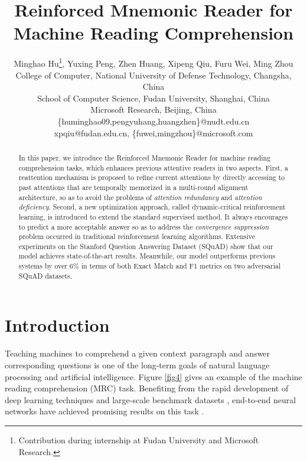 \documentclass{article}
\title{Reinforced Mnemonic Reader for Machine Reading Comprehension}
\author{
Minghao Hu\thanks{Contribution during internship at Fudan University and Microsoft Research.}, 
Yuxing Peng, 
Zhen Huang,
Xipeng Qiu, 
Furu Wei, 
Ming Zhou
\\ 
 College of Computer, National University of Defense Technology, Changsha, China \\
 School of Computer Science, Fudan University, Shanghai, China \\
 Microsoft Research, Beijing, China  \\
\{huminghao09,pengyuhang,huangzhen\}@nudt.edu.cn \\
xpqiu@fudan.edu.cn,
\{fuwei,mingzhou\}@microsoft.com
}
\begin{document}
\maketitle

\begin{abstract}
 In this paper, we introduce the Reinforced Mnemonic Reader for machine reading comprehension tasks, which enhances previous attentive readers in two aspects.
 First, a reattention mechanism is proposed to refine current attentions by directly accessing to past attentions that are temporally memorized in a multi-round alignment architecture, so as to avoid the problems of \emph{attention redundancy} and \emph{attention deficiency}.
 Second, a new optimization approach, called dynamic-critical reinforcement learning, is introduced to extend the standard supervised method. It always encourages to predict a more acceptable answer so as to address the \emph{convergence suppression} problem occurred in traditional reinforcement learning algorithms. 
 Extensive experiments on the Stanford Question Answering Dataset (SQuAD) show that our model achieves state-of-the-art results. Meanwhile, our model outperforms previous systems by over 6\% in terms of both Exact Match and F1 metrics on two adversarial SQuAD datasets. 
\end{abstract}
 \section{Introduction}
Teaching machines to comprehend a given context paragraph and answer corresponding questions is one of the long-term goals of natural language processing and artificial intelligence. 
Figure \ref{fig4} gives an example of the machine reading comprehension (MRC) task.  
Benefiting from the rapid development of deep learning techniques \cite{goodfellow2016deep} and large-scale benchmark datasets \cite{Hermann15,Hill16,Rajpurkar16}, end-to-end neural networks have achieved promising results on this task \cite{Wang17b,Seo17,Xiong17,Huang17}. 
\end{document}
